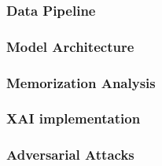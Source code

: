 \subsubsection{Data Pipeline}
\subsubsection{Model Architecture}
\subsubsection{Memorization Analysis}
\subsubsection{ XAI implementation}
\subsubsection{Adversarial Attacks}



